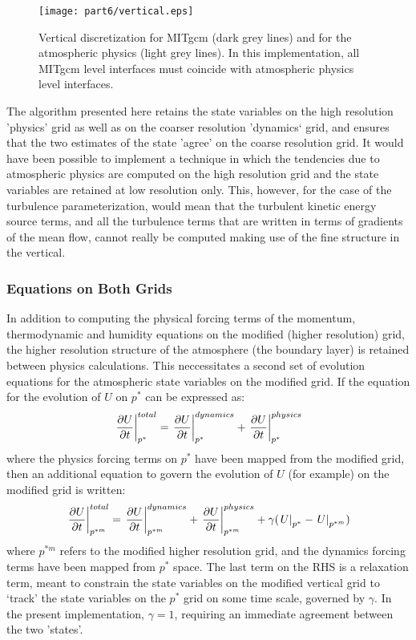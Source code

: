 \begin{figure}[htbp]
\vspace*{-0.4in}
\begin{center}
\texttt{[image: part6/vertical.eps]}
\caption{Vertical discretization for MITgcm (dark grey lines) and for the
atmospheric physics (light grey lines). In this implementation, all MITgcm level
interfaces must coincide with atmospheric physics level interfaces.}
\end{center}
\end{figure}

The algorithm presented here retains the state variables on the high resolution 'physics'
grid as well as on the coarser resolution 'dynamics` grid, and ensures that the two 
estimates of the state 'agree' on the coarse resolution grid.  It would have been possible 
to implement a technique in which the tendencies due to atmospheric physics are computed 
on the high resolution grid and the state variables are retained at low resolution only. 
This, however, for the case of the turbulence parameterization,  would mean that the 
turbulent kinetic energy source terms, and all the turbulence terms that are written 
in terms of gradients of the mean flow, cannot really be computed making use of the fine 
structure in the vertical. 

\subsubsection{Equations on Both Grids}

In addition to computing the physical forcing terms of the momentum, thermodynamic and humidity 
equations on the modified (higher resolution) grid, the higher resolution structure of the 
atmosphere (the boundary layer) is retained between physics calculations. This neccessitates
a second set of evolution equations for the atmospheric state variables on the modified grid. 
If the equation for the evolution of $U$ on $p^*$ can be expressed as:
\[
\left . {\partial U \over {\partial t}} \right |_{p^*}^{total} = 
\left . {\partial U \over {\partial t}} \right |_{p^*}^{dynamics} + 
\left . {\partial U \over {\partial t}} \right |_{p^*}^{physics}
\]
where the physics forcing terms on $p^*$ have been mapped from the modified grid, then an additional 
equation to govern the evolution of $U$ (for example) on the modified grid is written:
\[
\left . {\partial U \over {\partial t}} \right |_{p^{*m}}^{total} = 
\left . {\partial U \over {\partial t}} \right |_{p^{*m}}^{dynamics} + 
\left . {\partial U \over {\partial t}} \right |_{p^{*m}}^{physics} +
\gamma ({\left . U \right |_{p^*}} - {\left . U \right |_{p^{*m}}})
\]
where $p^{*m}$ refers to the modified higher resolution grid, and the dynamics forcing terms have 
been mapped from $p^*$ space.  The last term on the RHS is a relaxation term, meant to constrain
the state variables on the modified vertical grid to `track' the state variables on the $p^*$ grid 
on some time scale, governed by $\gamma$. In the present implementation, $\gamma = 1$, requiring
an immediate agreement between the two 'states'.

